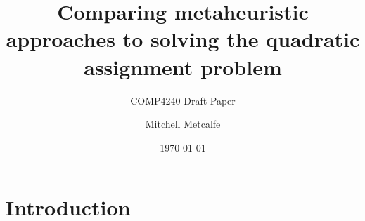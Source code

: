


\title{Comparing metaheuristic approaches to solving the quadratic assignment problem}
\subtitle{COMP4240 Draft Paper}
\author{Mitchell Metcalfe}

\date{\today}




  \maketitle

%


  \section{Introduction} {
     \label{sec:introduction}
     
   }


  
  


